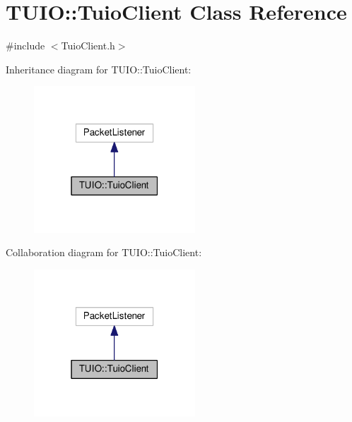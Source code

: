 \hypertarget{class_t_u_i_o_1_1_tuio_client}{}\section{T\+U\+IO\+:\+:Tuio\+Client Class Reference}
\label{class_t_u_i_o_1_1_tuio_client}


{\ttfamily \#include $<$Tuio\+Client.\+h$>$}



Inheritance diagram for T\+U\+IO\+:\+:Tuio\+Client\+:\nopagebreak
\begin{figure}[H]
\begin{center}
\leavevmode
\includegraphics[width=171pt]{class_t_u_i_o_1_1_tuio_client__inherit__graph}
\end{center}
\end{figure}


Collaboration diagram for T\+U\+IO\+:\+:Tuio\+Client\+:\nopagebreak
\begin{figure}[H]
\begin{center}
\leavevmode
\includegraphics[width=171pt]{class_t_u_i_o_1_1_tuio_client__coll__graph}
\end{center}
\end{figure}

